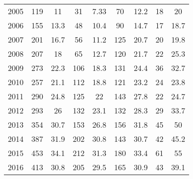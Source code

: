 \begin{table}[htbp]
\begin{tabular}{l*{8}{c}}
2005      &      119&       11&       31&     7.33&       70&     12.2&       18&       20\\
2006      &      155&     13.3&       48&     10.4&       90&     14.7&       17&     18.7\\
2007      &      201&     16.7&       56&     11.2&      125&     20.7&       20&     19.8\\
2008      &      207&       18&       65&     12.7&      120&     21.7&       22&     25.3\\
2009      &      273&     22.3&      106&     18.3&      131&     24.4&       36&     32.7\\
2010      &      257&     21.1&      112&     18.8&      121&     23.2&       24&     23.8\\
2011      &      290&     24.8&      125&       22&      143&     27.8&       22&     24.7\\
2012      &      293&       26&      132&     23.1&      132&     28.3&       29&     33.7\\
2013      &      354&     30.7&      153&     26.8&      156&     31.8&       45&       50\\
2014      &      387&     31.9&      202&     30.8&      143&     30.7&       42&     45.2\\
2015      &      453&     34.1&      212&     31.3&      180&     33.4&       61&       55\\
2016      &      413&     30.8&      205&     29.5&      165&     30.9&       43&     39.1\\
\hline\hline
\end{tabular}
\end{table}
